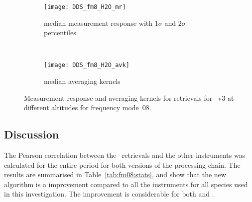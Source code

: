 \begin{figure}[htpb]
    \centering
    \begin{subfigure}[b]{0.49\textwidth}
        \texttt{[image: DDS\_fm8\_H2O\_mr]}
        \caption{median measurement response with $1\sigma$ and $2\sigma$
        percentiles}
        \label{fig:fm08:H2O:mr}
    \end{subfigure}
    \,
    \begin{subfigure}[b]{0.49\textwidth}
        \texttt{[image: DDS\_fm8\_H2O\_avk]}
        \caption{median averaging kernels\newline~}
        \label{fig:fm08:H2O:avk}
    \end{subfigure}
    \caption{Measurement response and averaging kernels for 
    retrievals for \smr~v3 at different altitudes for frequency mode~08.}
    \label{fig:fm08:H2O:mr_avk}
\end{figure}


\subsection{Discussion}
\label{sec:fm08:discussion}
The Pearson correlation between the \smr\ retrievals and the other instruments
was calculated for the entire period for both versions of the processing chain.
The results are summarised in Table~\ref{tab:fm08:stats}, and show that the
new algorithm is a improvement compared to all the instruments for all species
used in this investigation. The improvement is considerable for both 
and .


